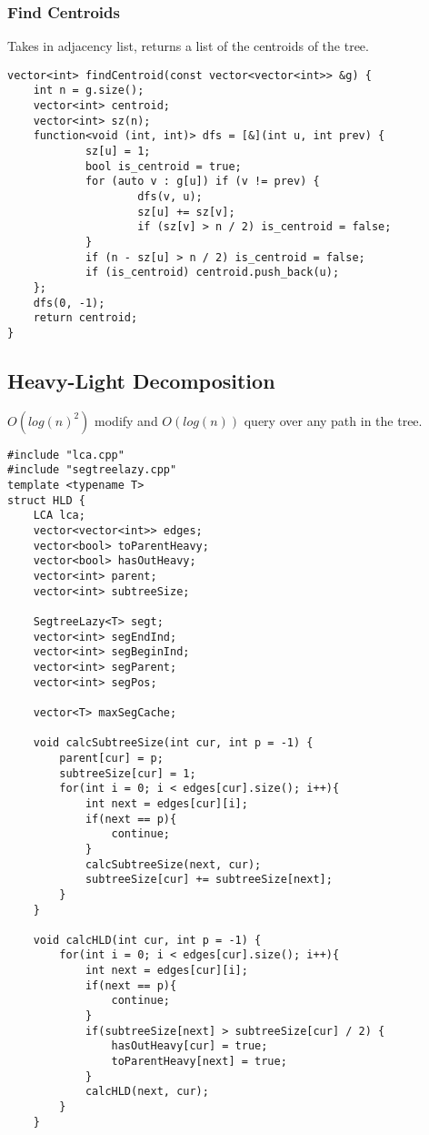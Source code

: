 \documentclass[8pt, headheight=10pt, a4paper]{article}
\begin{document}
\begin{multicols*}{3}
\subsubsection{Find Centroids}
Takes in adjacency list, returns a list of the centroids of the tree. 
\begin{lstlisting}
vector<int> findCentroid(const vector<vector<int>> &g) {
    int n = g.size();
    vector<int> centroid;
    vector<int> sz(n);
    function<void (int, int)> dfs = [&](int u, int prev) {
            sz[u] = 1;
            bool is_centroid = true;
            for (auto v : g[u]) if (v != prev) {
                    dfs(v, u);
                    sz[u] += sz[v];
                    if (sz[v] > n / 2) is_centroid = false;
            }
            if (n - sz[u] > n / 2) is_centroid = false;
            if (is_centroid) centroid.push_back(u);
    };
    dfs(0, -1);
    return centroid;
}
\end{lstlisting}

\subsection{Heavy-Light Decomposition}
$O(log(n)^2)$ modify and $O(log(n))$ query over any path in the tree.
\begin{lstlisting}
#include "lca.cpp"
#include "segtreelazy.cpp"
template <typename T>
struct HLD {
    LCA lca;
    vector<vector<int>> edges;
    vector<bool> toParentHeavy;
    vector<bool> hasOutHeavy;
    vector<int> parent;
    vector<int> subtreeSize;

    SegtreeLazy<T> segt;
    vector<int> segEndInd; 
    vector<int> segBeginInd; 
    vector<int> segParent; 
    vector<int> segPos;    

    vector<T> maxSegCache;   

    void calcSubtreeSize(int cur, int p = -1) {
        parent[cur] = p;
        subtreeSize[cur] = 1;
        for(int i = 0; i < edges[cur].size(); i++){
            int next = edges[cur][i];
            if(next == p){
                continue;
            }
            calcSubtreeSize(next, cur);
            subtreeSize[cur] += subtreeSize[next];
        }
    }

    void calcHLD(int cur, int p = -1) {
        for(int i = 0; i < edges[cur].size(); i++){
            int next = edges[cur][i];
            if(next == p){
                continue;
            }
            if(subtreeSize[next] > subtreeSize[cur] / 2) {
                hasOutHeavy[cur] = true;
                toParentHeavy[next] = true;
            }
            calcHLD(next, cur);
        }
    }


\end{lstlisting}
\end{multicols*}
\end{document}
